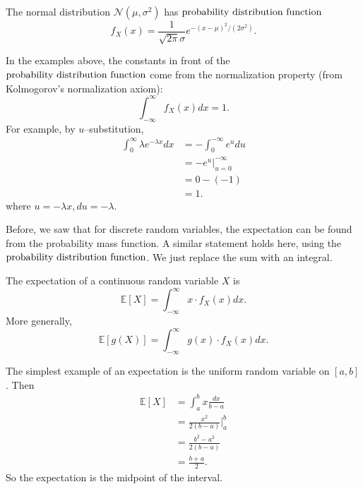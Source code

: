 \documentclass{ximera}
\begin{document}
\begin{example}
The normal distribution $\mathcal{N}(\mu,\sigma^2)$ has $\text{probability distribution function}$
$$
f_X(x) = \frac{1}{\sqrt{2\pi} \sigma} e^{-(x-\mu)^2/(2\sigma^2)}.
$$
\end{example}



In the examples above, the constants in front of the $\text{probability distribution function}$ come from the normalization property (from Kolmogorov's normalization axiom):
$$
\int_{-\infty}^{\infty} f_X(x)dx = 1.
$$
For example, by $u$--substitution,
\begin{align*}
\int_0^{\infty} \lambda e^{-\lambda x}dx &= -\int_0^{-\infty} e^{u} du \\
&= -e^u \Big|_{u=0}^{-\infty} \\
&= 0 - (-1) \\
&= 1.
\end{align*}
where $u=-\lambda x, du= -\lambda$.

Before, we saw that for discrete random variables, the expectation can be found from the probability mass function. A similar statement holds here, using the $\text{probability distribution function}$. We just replace the sum with an integral.

\begin{definition}
The expectation of a continuous random variable $X$ is
$$
\mathbb{E}[X] = \int_{-\infty}^{\infty} x \cdot f_X(x) dx.
$$
More generally,
$$
\mathbb{E}[g(X)] = \int_{-\infty}^{\infty} g(x) \cdot f_X(x) dx.
$$
\end{definition}

The simplest example of an expectation is the uniform random variable on $[a,b]$. Then
\begin{align*}
\mathbb{E}[X] &= \int_a^b x \frac{dx}{b-a} \\
&= \frac{x^2}{2(b-a)} \Big|_a^b \\
&= \frac{b^2-a^2}{2(b-a)} \\
&= \frac{b+a}{2}.
\end{align*}
So the expectation is the midpoint of the interval. 
\end{document}
